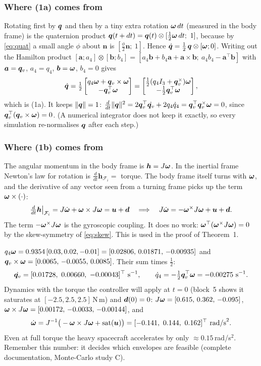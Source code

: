 \subsubsection*{Where (1a) comes from}
Rotating first by $\bm{q}$ and then by a tiny extra rotation $\bm{\omega}\,dt$ (measured in the body frame) is the quaternion
product $\vq(t+dt)=\vq(t)\otimes[\tfrac12\vw\,dt;\ 1]$, because by \eqref{eq:quat} a small angle $\phi$ about $\bm n$ is
$[\tfrac{\phi}{2}\bm n;\ 1]$. Hence $\dot{\bm{q}}=\tfrac12\,\bm{q}\otimes[\bm{\omega};0]$. Writing out the Hamilton product
$[\bm a;a_4]\otimes[\bm b;b_4]=[a_4\bm b+b_4\bm a+\bm a\times\bm b;\ a_4b_4-\bm a^\top\bm b]$ with $\bm a=\bm{q}_v$, $a_4=q_4$,
$\bm b=\bm{\omega}$, $b_4=0$ gives
\[
\dot{\bm{q}}=\tfrac12\begin{bmatrix}q_4\bm{\omega}+\bm{q}_v\times\bm{\omega}\\ -\bm{q}_v^\top\bm{\omega}\end{bmatrix}
=\begin{bmatrix}\tfrac12(q_4I_3+\bm{q}_v^\times)\bm{\omega}\\ -\tfrac12\bm{q}_v^\top\bm{\omega}\end{bmatrix},
\]
which is (1a). It keeps $\|\bm{q}\|=1$: $\tfrac{d}{dt}\|\bm{q}\|^2=2\bm{q}_v^\top\dot{\bm{q}_v}+2q_4\dot q_4=\bm{q}_v^\top\bm{q}_v^\times\bm{\omega}=0$, since
$\bm{q}_v^\top(\bm{q}_v\times\bm{\omega})=0$. (A numerical integrator does not keep it exactly, so every simulation re-normalises $\bm{q}$ after
each step.)

\subsubsection*{Where (1b) comes from}
The angular momentum in the body frame is $\bm h=J\bm{\omega}$. In the inertial frame Newton's law for rotation is
$\tfrac{d}{dt}\bm h_{\mathcal F_i}=$ torque. The body frame itself turns with $\bm{\omega}$, and the derivative of any vector
seen from a turning frame picks up the term $\bm{\omega}\times(\cdot)$:
\[
\tfrac{d}{dt}\bm h\big|_{\mathcal F_i}=J\dot{\bm{\omega}}+\bm{\omega}\times J\bm{\omega}=\bm{u}+\bm{d}
\quad\Longrightarrow\quad J\dot{\bm{\omega}}=-\bm{\omega}^\times J\bm{\omega}+\bm{u}+\bm{d} .
\]
The term $-\bm{\omega}^\times J\bm{\omega}$ is the gyroscopic coupling. It does no work: $\bm{\omega}^\top(\bm{\omega}^\times J\bm{\omega})=0$ by the
skew-symmetry of \eqref{eq:skew}. This is used in the proof of Theorem~1.

\begin{toybox}
$q_4\bm{\omega}=0.9354\,[0.03,0.02,-0.01]=[0.02806,\,0.01871,\,-0.00935]$ and
$\bm{q}_v\times\bm{\omega}=[0.0065,\,-0.0055,\,0.0085]$. Their sum times $\tfrac12$:
\[
\dot\qv=[0.01728,\ 0.00660,\ -0.00043]^\top\ \text{s}^{-1},\qquad \dot q_4=-\tfrac12\qv^\top\vw=-0.00275\ \text{s}^{-1}.
\]
Dynamics with the torque the controller will apply at $t=0$ (block~5 shows it saturates at $[-2.5,2.5,2.5]$\,N\,m) and
$\bm{d}(0)=0$: $J\bm{\omega}=[0.615,\,0.362,\,-0.095]$, $\bm{\omega}\times J\bm{\omega}=[0.00172,\,-0.0033,\,-0.00144]$, and
\[
\dot{\bm{\omega}}=J^{-1}\big(-\bm{\omega}\times J\bm{\omega}+\operatorname{sat}(\bm{u})\big)=[-0.141,\ 0.144,\ 0.162]^\top\ \text{rad/s}^2 .
\]
Even at full torque the heavy spacecraft accelerates by only $\approx0.15$\,rad/s$^2$. Remember this number: it
decides which envelopes are feasible (complete documentation, Monte-Carlo study C).
\end{toybox}

